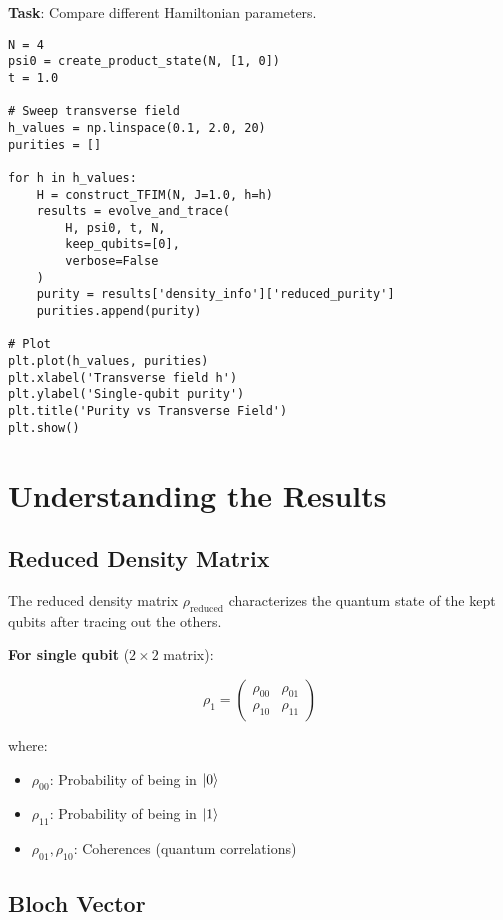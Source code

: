 \documentclass[11pt,a4paper]{article}
\begin{document}
\textbf{Task}: Compare different Hamiltonian parameters.

\begin{lstlisting}[caption={Parameter sweep}]
N = 4
psi0 = create_product_state(N, [1, 0])
t = 1.0

# Sweep transverse field
h_values = np.linspace(0.1, 2.0, 20)
purities = []

for h in h_values:
    H = construct_TFIM(N, J=1.0, h=h)
    results = evolve_and_trace(
        H, psi0, t, N,
        keep_qubits=[0],
        verbose=False
    )
    purity = results['density_info']['reduced_purity']
    purities.append(purity)

# Plot
plt.plot(h_values, purities)
plt.xlabel('Transverse field h')
plt.ylabel('Single-qubit purity')
plt.title('Purity vs Transverse Field')
plt.show()
\end{lstlisting}

\section{Understanding the Results}

\subsection{Reduced Density Matrix}

The reduced density matrix $\rho_{\text{reduced}}$ characterizes the quantum state of the kept qubits after tracing out the others.

\textbf{For single qubit} ($2 \times 2$ matrix):

\begin{equation}
    \rho_1 = \begin{pmatrix}
        \rho_{00} & \rho_{01} \\
        \rho_{10} & \rho_{11}
    \end{pmatrix}
\end{equation}

where:
\begin{itemize}
    \item $\rho_{00}$: Probability of being in $\ket{0}$
    \item $\rho_{11}$: Probability of being in $\ket{1}$
    \item $\rho_{01}, \rho_{10}$: Coherences (quantum correlations)
\end{itemize}

\subsection{Bloch Vector}
\end{document}
